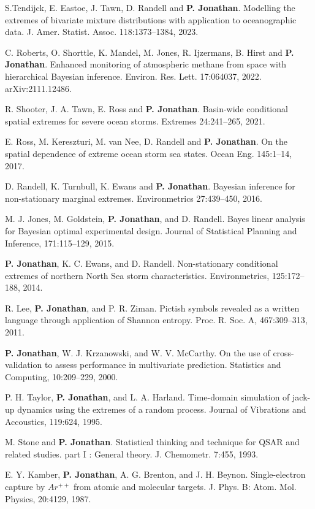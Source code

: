 \documentclass[11pt,a4paper]{moderncv}
\begin{document}
S.Tendijck, E. Eastoe, J. Tawn, D. Randell and \textbf{P. Jonathan}. Modelling the extremes of bivariate mixture distributions with application to oceanographic data. J. Amer. Statist. Assoc. 118:1373--1384, 2023.

C. Roberts, O. Shorttle, K. Mandel, M. Jones, R. Ijzermans, B. Hirst and \textbf{P. Jonathan}. Enhanced monitoring of atmospheric methane from space with hierarchical Bayesian inference. Environ. Res. Lett. 17:064037, 2022. arXiv:2111.12486.

R. Shooter, J. A. Tawn, E. Ross  and \textbf{P. Jonathan}. Basin-wide conditional spatial extremes for severe ocean storms. Extremes 24:241--265, 2021.

E. Ross, M. Kereszturi, M. van Nee, D. Randell and \textbf{P. Jonathan}. On the spatial dependence of extreme ocean storm sea states. Ocean Eng. 145:1--14, 2017.

D. Randell, K. Turnbull, K. Ewans and \textbf{P. Jonathan}. Bayesian inference for non-stationary marginal extremes. Environmetrics 27:439--450, 2016.

M. J. Jones, M. Goldstein, \textbf{P. Jonathan}, and D. Randell. Bayes linear analysis for Bayesian optimal experimental design. Journal of Statistical Planning and Inference, 171:115--129, 2015.

\textbf{P. Jonathan}, K. C. Ewans, and D. Randell. Non-stationary conditional extremes of northern North Sea storm characteristics. Environmetrics, 125:172--188, 2014.

R. Lee, \textbf{P. Jonathan}, and P. R. Ziman. Pictish symbols revealed as a written language through application of Shannon entropy. Proc. R. Soc. A, 467:309--313, 2011.

\textbf{P. Jonathan}, W. J. Krzanowski, and W. V. McCarthy. On the use of cross-validation to assess performance in multivariate prediction. Statistics and Computing, 10:209--229, 2000.

P. H. Taylor, \textbf{P. Jonathan}, and L. A. Harland. Time-domain simulation of jack-up dynamics using the extremes of a random process. Journal of Vibrations and Accoustics, 119:624, 1995.

M. Stone and \textbf{P. Jonathan}. Statistical thinking and technique for QSAR and related studies. part I : General theory. J. Chemometr. 7:455, 1993.

E. Y. Kamber, \textbf{P. Jonathan}, A. G. Brenton, and J. H. Beynon. Single-electron capture by $Ar^{++}$ from atomic and molecular targets. J. Phys. B: Atom. Mol. Physics, 20:4129, 1987.
\end{document}
